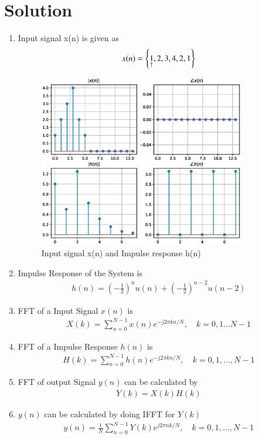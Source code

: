 \documentclass[journal,12pt,twocolumn]{IEEEtran}
\renewcommand\thesection{\arabic{section}}
\begin{document}
\section{Solution}
\begin{enumerate}[label=\thesection.\arabic*.,ref=\thesection.\theenumi]

\item Input signal x(n) is given as
\begin{align}
    x(n) = \left\{\underset{\uparrow}{1},2,3,4,2,1\right\} 
\end{align}
\begin{figure}[h!]
    \centering
    \includegraphics[width=9cm]{./figs/ee18btech11029_1.eps}
    \caption{Input signal x(n) and Impulse response h(n)}
    \label{yn}
\end{figure}
\item Impulse Response of the System is
\begin{align}
    h(n)=\left(-\frac{1}{2}\right)^{n} u(n)+\left(-\frac{1}{2}\right)^{n-2} u(n-2)	
\end{align}
\item FFT of a Input Signal $x(n)$ is 
\begin{align}
    X(k) = \sum_{n=0}^{N-1} x(n) e^{-j 2 \pi k n / N},\quad k=0,1 \ldots N-1
\end{align}
 
\item FFT of a Impulse Response $h(n)$ is 
\begin{align}
    H(k) = \sum_{n=0}^{N-1} h(n) e^{-j 2 \pi k n / N}, \quad k=0,1, \ldots, N-1
\end{align}

\item FFT of output Signal $y(n)$ can be calculated by 
\begin{align}
    Y(k) = X(k)H(k)
\end{align}
\item $y(n)$ can be calculated by doing IFFT for $Y(k)$
\begin{align}
    y(n) = \frac{1}{N}\sum_{n=0}^{N-1}Y(k) e^{j 2 \pi n k / N}, \quad k=0,1, \ldots, N-1
\end{align}
 

\end{enumerate}
\end{document}

